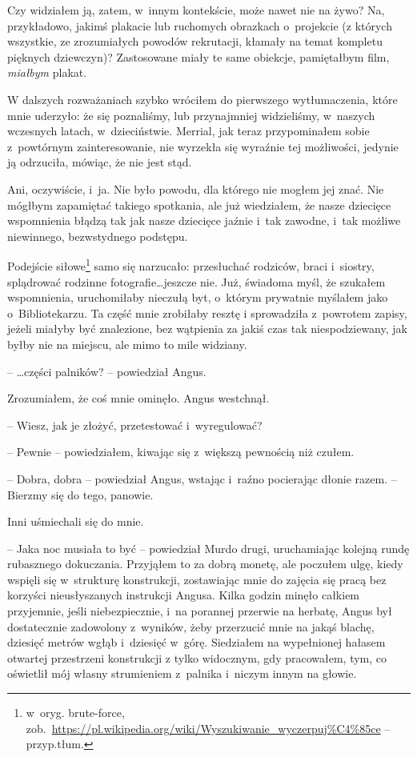 \documentclass[oneside,polish,11pt,sfheadings]{mwbk}
\begin{document}
Czy widziałem ją, zatem, w~innym kontekście, może nawet nie na żywo? Na,
przykładowo, jakimś plakacie lub ruchomych obrazkach o~projekcie (z
których wszystkie, ze zrozumiałych powodów rekrutacji, kłamały na temat
kompletu pięknych dziewczyn)? Zastosowane miały te same obiekcje,
pamiętałbym film, \textit{miałbym} plakat.

W dalszych rozważaniach szybko wróciłem do pierwszego wytłumaczenia,
które mnie uderzyło: że się poznaliśmy, lub przynajmniej widzieliśmy, w~naszych wczesnych latach, w~dzieciństwie. Merrial, jak teraz
przypominałem sobie z~powtórnym zainteresowanie, nie wyrzekła się
wyraźnie tej możliwości, jedynie ją odrzuciła, mówiąc, że nie jest stąd.

Ani, oczywiście, i~ja. Nie było powodu, dla którego nie mogłem jej znać.
Nie mógłbym zapamiętać takiego spotkania, ale już wiedziałem, że nasze
dziecięce wspomnienia błądzą tak jak nasze dziecięce jaźnie i~tak
zawodne, i~tak możliwe niewinnego, bezwstydnego podstępu.

Podejście siłowe\footnote{ w~oryg. brute-force,
zob.~\url{https://pl.wikipedia.org/wiki/Wyszukiwanie\_wyczerpuj\%C4\%85ce}
-- przyp.tłum.} samo się narzucało: przesłuchać rodziców, braci i~siostry, splądrować rodzinne fotografie\ldots jeszcze nie. Już, świadoma
myśl, że szukałem wspomnienia, uruchomiłaby nieczułą byt, o~którym
prywatnie myślałem jako o~Bibliotekarzu. Ta część mnie zrobiłaby resztę
i sprowadziła z~powrotem zapisy, jeżeli miałyby być znalezione, bez
wątpienia za jakiś czas tak niespodziewany, jak byłby nie na miejscu,
ale mimo to mile widziany.

-- \ldots części palników? -- powiedział Angus.

Zrozumiałem, że coś mnie ominęło. Angus westchnął.

-- Wiesz, jak je złożyć, przetestować i~wyregulować?

-- Pewnie -- powiedziałem, kiwając się z~większą pewnością niż czułem.

-- Dobra, dobra -- powiedział Angus, wstając i~raźno pocierając dłonie
razem. -- Bierzmy się do tego, panowie.

Inni uśmiechali się do mnie.

-- Jaka noc musiała to być -- powiedział Murdo drugi, uruchamiając kolejną
rundę rubasznego dokuczania. Przyjąłem to za dobrą monetę, ale poczułem
ulgę, kiedy wspięli się w~strukturę konstrukcji, zostawiając mnie do
zajęcia się pracą bez korzyści nieusłyszanych instrukcji Angusa. Kilka
godzin minęło całkiem przyjemnie, jeśli niebezpiecznie, i~na porannej
przerwie na herbatę, Angus był dostatecznie zadowolony z~wyników, żeby
przerzucić mnie na jakąś blachę, dziesięć metrów wgłąb i~dziesięć w~górę. Siedziałem na wypełnionej hałasem otwartej przestrzeni konstrukcji
z tylko widocznym, gdy pracowałem, tym, co oświetlił mój własny
strumieniem z~palnika i~niczym innym na głowie.
\end{document}
